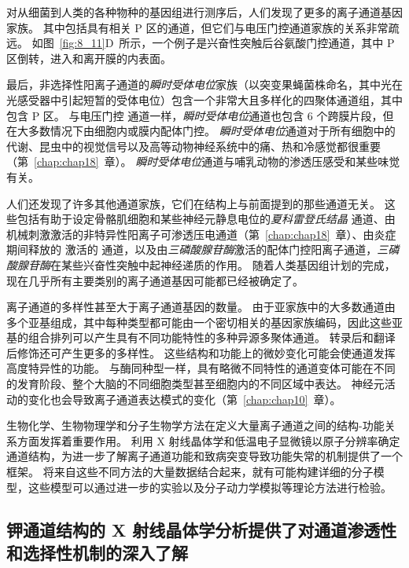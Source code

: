 对从细菌到人类的各种物种的基因组进行测序后，人们发现了更多的离子通道基因家族。
其中包括具有相关 P 区的通道，但它们与电压门控通道家族的关系非常疏远。
如图~\ref{fig:8_11}D~所示，一个例子是兴奋性突触后谷氨酸门控通道，其中 P 区倒转，进入和离开膜的内表面。


最后，非选择性阳离子通道的\textit{瞬时受体电位}家族（以突变果蝇菌株命名，其中光在光感受器中引起短暂的受体电位）包含一个非常大且多样化的四聚体通道组，其中包含 P 区。
与电压门控  通道一样，\textit{瞬时受体电位}通道也包含 6 个跨膜片段，但在大多数情况下由细胞内或膜内配体门控。
\textit{瞬时受体电位}通道对于所有细胞中的代谢、昆虫中的视觉信号以及高等动物神经系统中的痛、热和冷感觉都很重要（第~\ref{chap:chap18}~章）。
\textit{瞬时受体电位}通道与哺乳动物的渗透压感受和某些味觉有关。


人们还发现了许多其他通道家族，它们在结构上与前面提到的那些通道无关。
这些包括有助于设定骨骼肌细胞和某些神经元静息电位的\textit{夏科雷登氏结晶}  通道、由机械刺激激活的非特异性阳离子可渗透压电通道（第~\ref{chap:chap18}~章）、由炎症期间释放的  激活的  通道，以及由\textit{三磷酸腺苷酶}激活的配体门控阳离子通道，\textit{三磷酸腺苷酶}在某些兴奋性突触中起神经递质的作用。
随着人类基因组计划的完成，现在几乎所有主要类别的离子通道基因可能都已经被确定了。


离子通道的多样性甚至大于离子通道基因的数量。
由于亚家族中的大多数通道由多个亚基组成，其中每种类型都可能由一个密切相关的基因家族编码，因此这些亚基的组合排列可以产生具有不同功能特性的多种异源多聚体通道。
转录后和翻译后修饰还可产生更多的多样性。
这些结构和功能上的微妙变化可能会使通道发挥高度特异性的功能。
与酶同种型一样，具有略微不同特性的通道变体可能在不同的发育阶段、整个大脑的不同细胞类型甚至细胞内的不同区域中表达。
神经元活动的变化也会导致离子通道表达模式的变化（第~\ref{chap:chap10}~章）。


生物化学、生物物理学和分子生物学方法在定义大量离子通道之间的结构-功能关系方面发挥着重要作用。
利用 X 射线晶体学和低温电子显微镜以原子分辨率确定通道结构，为进一步了解离子通道功能和致病突变导致功能失常的机制提供了一个框架。
将来自这些不同方法的大量数据结合起来，就有可能构建详细的分子模型，这些模型可以通过进一步的实验以及分子动力学模拟等理论方法进行检验。





\subsection{钾通道结构的 X 射线晶体学分析提供了对通道渗透性和选择性机制的深入了解}

